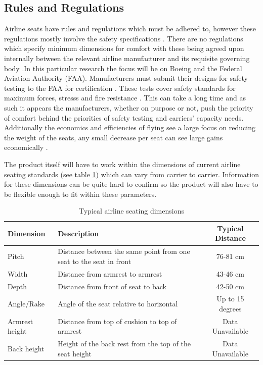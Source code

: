 \documentclass[conference]{IEEEtran}
\begin{document}
    \subsection{Rules and Regulations}
    Airline seats have rules and regulations which must be adhered to, however these regulations mostly involve the safety specifications \cite{CornellLaw}. There are no regulations which specify minimum dimensions for comfort with these being agreed upon internally between the relevant airline manufacturer and its requisite governing body \cite{CASA}.In this particular research the focus will be on Boeing and the Federal Aviation Authority (FAA). Manufacturers must submit their designs for safety testing to the FAA for certification \cite{TSO}. These tests cover safety standards for maximum forces, stresss and fire resistance \cite{Housel2004}. This can take a long time and as such it appears the manufacturers, whether on purpose or not, push the priority of comfort behind the priorities of safety testing and carriers' capacity needs. Additionally the economics and efficiencies of flying see a large focus on reducing the weight of the seats, any small decrease per seat can see large gains economically \cite{RECARO2010}.
    
    The product itself will have to work within the dimensions of current airline seating standards (see table \ref{dimensions}) which can vary from carrier to carrier. Information for these dimensions can be quite hard to confirm so the product will also have to be flexible enough to fit within these parameters.
        
\begin{table}[!t]
    \centering
    \caption{Typical airline seating dimensions
    \cite{Goonetilleke2001,SKYTRAXOnline2014}}
    \label{dimensions}
    \begin{tabular}{l p{3cm} c}
    \hline
    Dimension      & Description                                                        & Typical Distance \\ \hline \hline
    Pitch          & Distance between the same point from one seat to the seat in front & 76-81 cm         \\ \hline
    Width          & Distance from armrest to armrest                                   & 43-46 cm         \\ \hline
    Depth          & Distance from front of seat to back                                & 42-50 cm         \\ \hline
    Angle/Rake     & Angle of the seat relative to horizontal                           & Up to 15 degrees \\ \hline
    Armrest height & Distance from top of cushion to top of armrest                     & Data Unavailable \\ \hline
    Back height    & Height of the back rest from the top of the seat height            & Data Unavailable \\ 
    \end{tabular}
\end{table}
\end{document}
